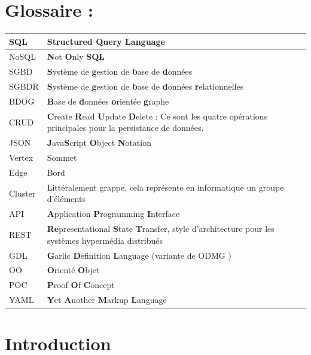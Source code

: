 \documentclass[a4paper,fleqn,12pt,oneside]{book}
\begin{document}
\chapter*{Glossaire :}
\begin{center}
\begin{tabular}[c]{ l p{14cm} }
 SQL  & \textbf{S}tructured \textbf{Q}uery \textbf{L}anguage \\ \hline
 NoSQL  & \textbf{N}ot \textbf{O}nly \textbf{SQL} \\ \hline
 SGBD  & \textbf{S}ystème de \textbf{g}estion de \textbf{b}ase de \textbf{d}onnées \\ \hline
 SGBDR  & \textbf{S}ystème de \textbf{g}estion de \textbf{b}ase de \textbf{d}onnées \textbf{r}elationnelles \\ \hline
 BDOG  & \textbf{B}ase de \textbf{d}onnées \textbf{o}rientée \textbf{g}raphe \\ \hline
 CRUD  & \textbf{C}reate \textbf{R}ead \textbf{U}pdate \textbf{D}elete : Ce sont les quatre opérations principales pour la persistance de données. \\ \hline
 JSON  & \textbf{J}ava\textbf{S}cript \textbf{O}bject \textbf{N}otation \\ \hline
 Vertex  & Sommet \\ \hline
 Edge  & Bord \\ \hline
 Cluster  & Littéralement grappe, cela représente en informatique un groupe d'éléments \\ \hline
 API  & \textbf{A}pplication \textbf{P}rogramming \textbf{I}nterface  \\ \hline
 REST  & \textbf{Re}presentational \textbf{S}tate \textbf{T}ransfer, style d'architecture pour les systèmes hypermédia distribués \\ \hline
 GDL & \textbf{G}arlic \textbf{D}efinition \textbf{L}anguage (variante de ODMG \cite{cattell1997object}) \\ \hline
 OO & \textbf{O}rienté \textbf{O}bjet \\ \hline
 POC & \textbf{P}roof \textbf{O}f \textbf{C}oncept \\ \hline
 YAML & \textbf{Y}et \textbf{A}nother \textbf{M}arkup \textbf{L}anguage \\ \hline
\end{tabular}
\end{center}
\clearpage
\setcounter{page}{1}
\mainmatter
\chapter{Introduction}
\end{document}

